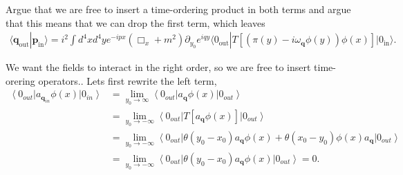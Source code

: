\documentclass[working, oneside]{../../Preambles/tuftebook}
\begin{document}
\begin{exercise}[8]
Argue that we are free to insert a time-ordering product in both terms and argue that this means that we can drop the first term, which leaves
\begin{align*}
\langle \mathbf{q}_{\text{out}} | \mathbf{p}_{\text{in}} \rangle = i^2 \int d^4x d^4y e^{-ipx} (\Box_x + m^2) \partial_{y_0} e^{iqy} \langle 0_{\text{out}} | T \left[ \left( \pi(y) - i \omega_\mathbf{q} \phi(y) \right) \phi(x) \right] | 0_{\text{in}} \rangle. \tag{96}
\end{align*}
\end{exercise}
\begin{solution}
We want the fields to interact in the right order, so we are free to insert time-orering operators.. Lets first rewrite the left term,
\begin{align*}
    \left<0_{out} \right|a_{\mathbf{q}_{in}} \phi \left( x \right)  \left|0_{in} \right> &= \lim_{y_0 \to \infty} \left<0_{out} \right| a_{\mathbf{q}}\phi \left( x \right) \left|0_{out} \right> \\
    &=\lim_{y_0 \to -\infty} \left<0_{out} \right| T\left[   a_{\mathbf{q}}\phi \left( x \right) \right]\left|0_{out} \right> \\
    &=\lim_{y_0 \to -\infty} \left<0_{out} \right|  \theta \left( y_0 - x_0 \right)   a_{\mathbf{q}}\phi \left( x \right) + \theta \left( x_0 - y_0 \right) \phi \left( x \right)a_{\mathbf{q}}\left|0_{out} \right> \\
    &=\lim_{y_0 \to -\infty} \left<0_{out} \right|  \theta \left( y_0 - x_0 \right)   a_{\mathbf{q}}\phi \left( x \right)\left|0_{out} \right> = 0
.\end{align*}

\end{solution}
\end{document}
